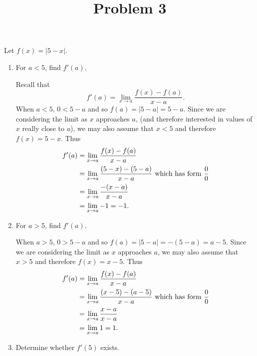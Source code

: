 \documentclass{ximera}
\title[Problem 3]{Problem 3}
\begin{document}
\begin{abstract} \end{abstract}
\maketitle


\begin{problem}
Let $f(x) = |5-x|$.
	
	\begin{enumerate}
	
	\item For $a < 5$, find $f'(a)$.
	
		\begin{explanation}
		Recall that 
		$$f'(a) = \lim_{x \to a} \frac{f(x) - f(a)}{x-a}.$$
		When $a < 5$, $0 < 5-a$ and so $f(a) = |5-a| = 5-a$.  Since we are considering the limit as $x$ approaches $a$, (and therefore interested in values of $x$  really close to $a$), we may also assume that $x < 5$ and therefore $f(x) = 5-x$.  Thus
		\begin{align*}
		f'(a) &= \lim_{x \to a} \frac{f(x) - f(a)}{x-a}  \\
		&= \lim_{x \to a} \frac{(5-x) - (5-a)}{x-a}  \textrm{ which has form } \dfrac{0}{0} \\
		&= \lim_{x \to a} \frac{-(x-a)}{x-a}  \\
		&= \lim_{x \to a} -1 = -1.
		\end{align*}

		\end{explanation}
	\item For $a > 5$, find $f'(a)$.
	
		\begin{explanation}
		When $a > 5$, $0 > 5-a$ and so $f(a) = |5-a| = -(5-a) = a-5$.  Since we are considering the limit as $x$ approaches $a$, we may also assume that $x > 5$ and therefore $f(x) = x-5$.  Thus
		\begin{align*}
		f'(a) &= \lim_{x \to a} \frac{f(x) - f(a)}{x-a}  \\
		&= \lim_{x \to a} \frac{(x-5) - (a-5)}{x-a}  \textrm{ which has form } \dfrac{0}{0} \\
		&= \lim_{x \to a} \frac{x-a}{x-a}  \\
		&= \lim_{x \to a} 1 = 1.
		\end{align*}

		\end{explanation}
	\item Determine whether $f'(5)$ exists.  
	

\end{enumerate}
\end{problem}
\end{document}
